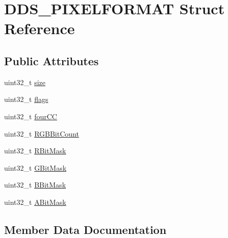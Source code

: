 \hypertarget{struct_d_d_s___p_i_x_e_l_f_o_r_m_a_t}{}\section{D\+D\+S\+\_\+\+P\+I\+X\+E\+L\+F\+O\+R\+M\+AT Struct Reference}
\label{struct_d_d_s___p_i_x_e_l_f_o_r_m_a_t}
\subsection*{Public Attributes}
\begin{DoxyCompactItemize}
\item 
uint32\+\_\+t \hyperlink{struct_d_d_s___p_i_x_e_l_f_o_r_m_a_t_adb357eb46848e57b8d89b59d31608f6c}{size}
\item 
uint32\+\_\+t \hyperlink{struct_d_d_s___p_i_x_e_l_f_o_r_m_a_t_a1909f63ad2d0a257bf5e8dba9e2d9475}{flags}
\item 
uint32\+\_\+t \hyperlink{struct_d_d_s___p_i_x_e_l_f_o_r_m_a_t_aa7af0012c64480e8eeafa25d7892c310}{four\+CC}
\item 
uint32\+\_\+t \hyperlink{struct_d_d_s___p_i_x_e_l_f_o_r_m_a_t_af53071b3c2912f56e4b54533d8101951}{R\+G\+B\+Bit\+Count}
\item 
uint32\+\_\+t \hyperlink{struct_d_d_s___p_i_x_e_l_f_o_r_m_a_t_a2d2f8c19c50ceb8677b0be2d1090c234}{R\+Bit\+Mask}
\item 
uint32\+\_\+t \hyperlink{struct_d_d_s___p_i_x_e_l_f_o_r_m_a_t_a13f1281d9cb4a6e001541c78d58ead8b}{G\+Bit\+Mask}
\item 
uint32\+\_\+t \hyperlink{struct_d_d_s___p_i_x_e_l_f_o_r_m_a_t_a94e8f580b6c716d600be37525b3ebf44}{B\+Bit\+Mask}
\item 
uint32\+\_\+t \hyperlink{struct_d_d_s___p_i_x_e_l_f_o_r_m_a_t_ada163cba3be6a89fc99166b3d6d49050}{A\+Bit\+Mask}
\end{DoxyCompactItemize}


\subsection{Member Data Documentation}
\hypertarget{struct_d_d_s___p_i_x_e_l_f_o_r_m_a_t_ada163cba3be6a89fc99166b3d6d49050}{}\label{struct_d_d_s___p_i_x_e_l_f_o_r_m_a_t_ada163cba3be6a89fc99166b3d6d49050} 
